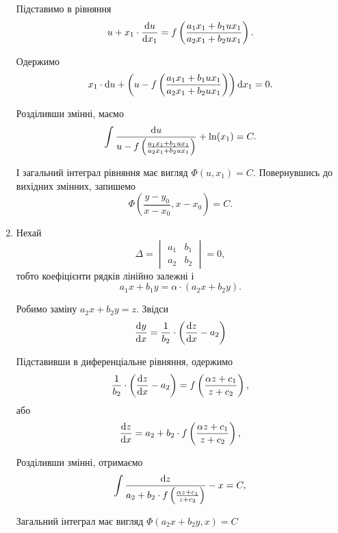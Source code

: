 \begin{enumerate}
	Підставимо в рівняння
	\begin{equation*}
		u + x_1 \cdot \frac{\mathop{}\!\mathrm{d} u}{\mathop{}\!\mathrm{d} x_1} = f \left( \frac{a_1 x_1 + b_1 u x_1}{a_2 x_1 + b_2 u x_1} \right).
	\end{equation*}
	
	Одержимо
	\begin{equation*}
		x_1 \cdot \mathop{}\!\mathrm{d} u + \left( u - f \left( \frac{a_1 x_1 + b_1 u x_1}{a_2 x_1 + b_2 u x_1} \right) \right) \mathop{}\!\mathrm{d} x_1 = 0.
	\end{equation*}

	Розділивши змінні, маємо
	\begin{equation*}
		\int \frac{\mathop{}\!\mathrm{d} u}{u - f \left( \frac{a_1 x_1 + b_1 u x_1}{a_2 x_1 + b_2 u x_1} \right)} + \ln (x_1) = C.
	\end{equation*}

	І загальний інтеграл рівняння має вигляд $\Phi(u, x_1) = C$. Повернувшись до вихідних змінних, запишемо
	\begin{equation*}
		\Phi \left( \frac{y - y_0}{x - x_0}, x - x_0 \right) = C.
	\end{equation*}

	\item Нехай 
	\begin{equation*}
		\Delta = 
		\begin{vmatrix} 
			a_1 & b_1 \\ 
			a_2 & b_2 
		\end{vmatrix} 
		= 0,
	\end{equation*}
	тобто коефіцієнти рядків лінійно залежні і
	\begin{equation*}
		a_1 x + b_1 y = \alpha \cdot (a_2 x + b_2 y).
	\end{equation*}

	Робимо заміну $a_2 x + b_2 y = z$. Звідси 
	\begin{equation*}
		\frac{\mathop{}\!\mathrm{d} y}{\mathop{}\!\mathrm{d} x} = \frac{1}{b_2} \cdot \left( \frac{\mathop{}\!\mathrm{d} z}{\mathop{}\!\mathrm{d} x} - a_2 \right)
	\end{equation*}

	Підставивши в диференціальне рівняння, одержимо
	\begin{equation*}
		\frac{1}{b_2} \cdot \left( \frac{\mathop{}\!\mathrm{d} z}{\mathop{}\!\mathrm{d} x} - a_2 \right) = f \left ( \frac{\alpha z + c_1}{z + c_2} \right),
	\end{equation*}
	або
	\begin{equation*}
		\frac{\mathop{}\!\mathrm{d} z}{\mathop{}\!\mathrm{d} x} = a_2 + b_2 \cdot f \left ( \frac{\alpha z + c_1}{z + c_2} \right),
	\end{equation*}

	Розділивши змінні, отримаємо
	\begin{equation*}
		\int \frac{\mathop{}\!\mathrm{d} z}{a_2 + b_2 \cdot f \left ( \frac{\alpha z + c_1}{z + c_2} \right)} - x = C,
	\end{equation*}

	Загальний інтеграл має вигляд $\Phi(a_2 x + b_2 y, x) = C$
\end{enumerate}
